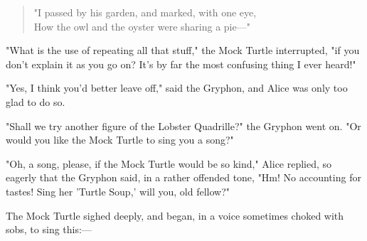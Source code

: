 \begin{quote}
"I passed by his garden, and marked, with one eye,\\
How the owl and the oyster were sharing a pie—"
\end{quote}



"What is the use of repeating all that stuff," the Mock Turtle interrupted, "if you don't explain it as you go on? It's by far the most confusing thing I ever heard!"

"Yes, I think you'd better leave off," said the Gryphon, and Alice was only too glad to do so.

"Shall we try another figure of the Lobster Quadrille?" the Gryphon went on. "Or would you like the Mock Turtle to sing you a song?"

"Oh, a song, please, if the Mock Turtle would be so kind," Alice replied, so eagerly that the Gryphon said, in a rather offended tone, "Hm! No accounting for tastes! Sing her 'Turtle Soup,' will you, old fellow?"

The Mock Turtle sighed deeply, and began, in a voice sometimes choked with sobs, to sing this:—

